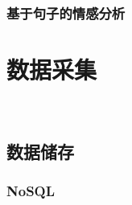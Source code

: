 \documentclass[cs4size,a4paper]{ctexart}
\numberwithin{equation}{section}
\numberwithin{table}{section}
\numberwithin{figure}{section}
\newcommand{\upcite}[1]{\textsuperscript{\textsuperscript{\cite{#1}}}}%
\begin{document}
\subsubsection{基于句子的情感分析}




\section{数据采集}~\label{数据采集}


\subsection{数据储存}

\subsubsection{NoSQL}
\end{document}
